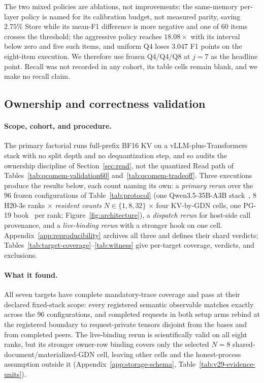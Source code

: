 \documentclass{article}
\begin{document}
The two mixed policies are ablations, not improvements: the same-memory
per-layer policy is named for its calibration budget, not measured parity,
saving $2.75\%$ Store while its mean-F1 difference is more negative and one of
60 items crosses the threshold; the aggressive policy reaches
$18.08\times$ with its interval below zero and five such items, and uniform Q4
loses $3.047$ F1 points on the eight-item execution.  We therefore use frozen
Q4/Q4/Q8 at $j=7$ as the headline point.  Recall was not recorded in any cohort,
its table cells remain blank, and we make no recall claim.

\subsection{Ownership and correctness validation}
\label{sec:correctness}
\label{sec:results}

\paragraph{Scope, cohort, and procedure.} \label{sec:target-status} The primary
factorial runs full-prefix BF16 KV on a vLLM-plus-Transformers stack with no
split depth and no dequantization step, and so audits the ownership discipline
of Section~\ref{sec:read}, not the quantized Read path of
Tables~\ref{tab:qcomem-validation60} and~\ref{tab:qcomem-tradeoff}.
Three executions produce the results below, each count naming its own: a
\emph{primary rerun} over the $96$ frozen configurations of
Table~\ref{tab:protocol} (one Qwen3.5-35B-A3B
stack~\citep{qwen2026qwen35,qwen2026qwen35modelcard}, $8$ H20-3e ranks $\times$
\emph{resident counts} $N\in\{1,8,32\}$ $\times$ four KV-by-GDN cells, one PG-19
book~\citep{rae2020compressive} per rank; Figure~\ref{fig:architecture}), a
\emph{dispatch rerun} for host-side call provenance, and a \emph{live-binding
rerun} with a stronger hook on one cell.  Appendix~\ref{app:reproducibility} archives all
three and defines their shard verdicts;
Tables~\ref{tab:target-coverage}--\ref{tab:witness} give per-target coverage,
verdicts, and exclusions.

\paragraph{What it found.}
All seven targets have complete mandatory-trace coverage and pass at their
declared fixed-stack scope: every registered semantic observable matches exactly
across the 96 configurations, and completed requests in both setup arms rebind
at the registered boundary to request-private tensors disjoint from the bases
and from completed peers.  The live-binding rerun is scientifically valid on all
eight ranks, but its stronger owner-row binding covers only the selected $N=8$
shared-document/materialized-GDN cell, leaving other cells and the
honest-process assumption outside it (Appendix~\ref{app:storage-schema},
Table~\ref{tab:v29-evidence-units}).%
\end{document}
